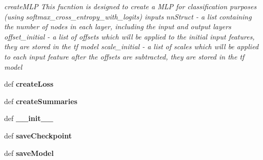 \begin{DoxyCompactItemize}
\begin{DoxyCompactList}\small\item\em create\-M\-L\-P This fucntion is designed to create a M\-L\-P for classification purposes (using softmax\-\_\-cross\-\_\-entropy\-\_\-with\-\_\-logits) inputs nn\-Struct -\/ a list containing the number of nodes in each layer, including the input and output layers offset\-\_\-initial -\/ a list of offsets which will be applied to the initial input features, they are stored in the tf model scale\-\_\-initial -\/ a list of scales which will be applied to each input feature after the offsets are subtracted, they are stored in the tf model \end{DoxyCompactList}\item 
\hypertarget{classCreateModel_1_1CreateModel_af62e9701279bf334d846b2bdab92ff07}{def {\bfseries create\-Loss}}\label{classCreateModel_1_1CreateModel_af62e9701279bf334d846b2bdab92ff07}

\item 
\hypertarget{classCreateModel_1_1CreateModel_af805be8e303ddaa94a75df73c75f0fc9}{def {\bfseries create\-Summaries}}\label{classCreateModel_1_1CreateModel_af805be8e303ddaa94a75df73c75f0fc9}

\item 
\hypertarget{classCreateModel_1_1CreateModel_a527f4037d16fe1dd9dba682fec50e334}{def {\bfseries \-\_\-\-\_\-init\-\_\-\-\_\-}}\label{classCreateModel_1_1CreateModel_a527f4037d16fe1dd9dba682fec50e334}

\item 
\hypertarget{classCreateModel_1_1CreateModel_a0e44fc09daba6296a83de649fe589e28}{def {\bfseries save\-Checkpoint}}\label{classCreateModel_1_1CreateModel_a0e44fc09daba6296a83de649fe589e28}

\item 
\hypertarget{classCreateModel_1_1CreateModel_ac8f6b70f7239f4448c693435adca9b37}{def {\bfseries save\-Model}}\label{classCreateModel_1_1CreateModel_ac8f6b70f7239f4448c693435adca9b37}

\end{DoxyCompactItemize}
